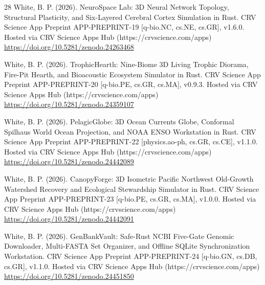 \documentclass[10pt,letterpaper]{article}
\begin{document}
\begin{thebibliography}{28}
 White, B. P. (2026). NeuroSpace Lab: 3D Neural Network Topology, Structural Plasticity, and Six-Layered Cerebral Cortex Simulation in Rust. CRV Science App Preprint APP-PREPRINT-19 [q-bio.NC, cs.NE, cs.GR], v1.6.0. Hosted via CRV Science Apps Hub (https://crvscience.com/apps) \url{https://doi.org/10.5281/zenodo.24263468}

 White, B. P. (2026). TrophicHearth: Nine-Biome 3D Living Trophic Diorama, Fire-Pit Hearth, and Bioacoustic Ecosystem Simulator in Rust. CRV Science App Preprint APP-PREPRINT-20 [q-bio.PE, cs.GR, cs.MA], v0.9.3. Hosted via CRV Science Apps Hub (https://crvscience.com/apps) \url{https://doi.org/10.5281/zenodo.24359107}

 White, B. P. (2026). PelagicGlobe: 3D Ocean Currents Globe, Conformal Spilhaus World Ocean Projection, and NOAA ENSO Workstation in Rust. CRV Science App Preprint APP-PREPRINT-22 [physics.ao-ph, cs.GR, cs.CE], v1.1.0. Hosted via CRV Science Apps Hub (https://crvscience.com/apps) \url{https://doi.org/10.5281/zenodo.24442089}

 White, B. P. (2026). CanopyForge: 3D Isometric Pacific Northwest Old-Growth Watershed Recovery and Ecological Stewardship Simulator in Rust. CRV Science App Preprint APP-PREPRINT-23 [q-bio.PE, cs.GR, cs.MA], v1.0.0. Hosted via CRV Science Apps Hub (https://crvscience.com/apps) \url{https://doi.org/10.5281/zenodo.24442091}

 White, B. P. (2026). GenBankVault: Safe-Rust NCBI Five-Gate Genomic Downloader, Multi-FASTA Set Organizer, and Offline SQLite Synchronization Workstation. CRV Science App Preprint APP-PREPRINT-24 [q-bio.GN, cs.DB, cs.GR], v1.1.0. Hosted via CRV Science Apps Hub (https://crvscience.com/apps) \url{https://doi.org/10.5281/zenodo.24451850}
\end{thebibliography}
\end{document}
